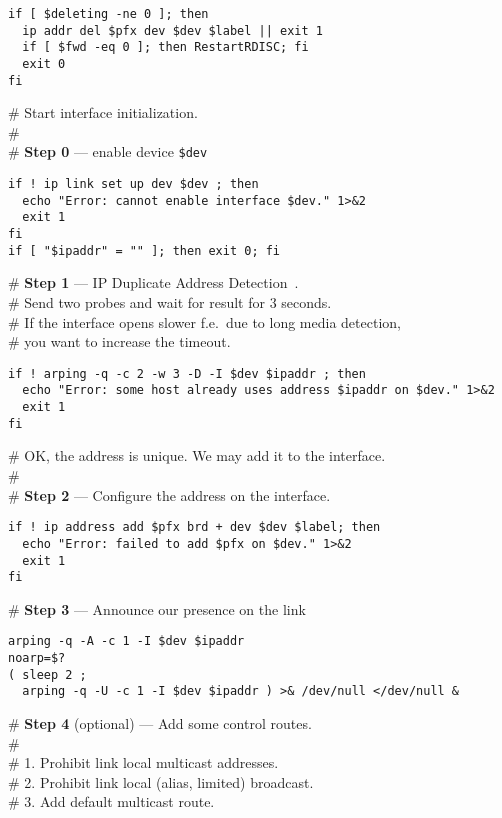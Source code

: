 \begin{verbatim}
if [ $deleting -ne 0 ]; then
  ip addr del $pfx dev $dev $label || exit 1
  if [ $fwd -eq 0 ]; then RestartRDISC; fi
  exit 0
fi
\end{verbatim}
\begin{flushleft}
\# Start interface initialization.\\
\#\\
\# {\bf Step 0} --- enable device \verb|$dev|
\end{flushleft}
\begin{verbatim}
if ! ip link set up dev $dev ; then
  echo "Error: cannot enable interface $dev." 1>&2
  exit 1
fi
if [ "$ipaddr" = "" ]; then exit 0; fi
\end{verbatim}
\begin{flushleft}
\# {\bf Step 1} --- IP Duplicate Address Detection~\cite{RFC-DHCP}.\\
\# Send two probes and wait for result for 3 seconds.\\
\# If the interface opens slower f.e.\ due to long media detection,\\
\# you want to increase the timeout.\\
\end{flushleft}
\begin{verbatim}
if ! arping -q -c 2 -w 3 -D -I $dev $ipaddr ; then
  echo "Error: some host already uses address $ipaddr on $dev." 1>&2
  exit 1
fi
\end{verbatim}
\begin{flushleft}
\# OK, the address is unique. We may add it to the interface.\\
\#\\
\# {\bf Step 2} --- Configure the address on the interface.
\end{flushleft}
\begin{verbatim}
if ! ip address add $pfx brd + dev $dev $label; then
  echo "Error: failed to add $pfx on $dev." 1>&2
  exit 1
fi
\end{verbatim}
\noindent\# {\bf Step 3} --- Announce our presence on the link
\begin{verbatim}
arping -q -A -c 1 -I $dev $ipaddr
noarp=$?
( sleep 2 ;
  arping -q -U -c 1 -I $dev $ipaddr ) >& /dev/null </dev/null &
\end{verbatim}
\begin{flushleft}
\# {\bf Step 4} (optional) --- Add some control routes.\\
\#\\
\# 1. Prohibit link local multicast addresses.\\
\# 2. Prohibit link local (alias, limited) broadcast.\\
\# 3. Add default multicast route.
\end{flushleft}

